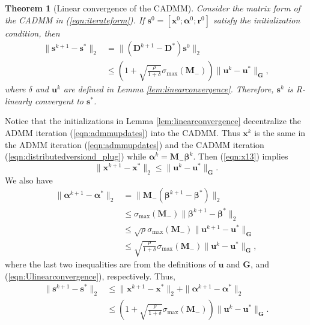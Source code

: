 \documentclass[journal]{IEEEtran}
\newtheorem{theorem}{Theorem}
\newcommand{\nn}{\nonumber}
\begin{document}
\begin{theorem}[Linear convergence of the CADMM]
\label{thm:linearconandbound}
Consider the matrix form of the CADMM in (\ref{eqn:iterateform}). If $\bm s^0=[\bm x^0;\bm\alpha^0;\bm r^0]$ satisfy the initialization condition, then 
\begin{align}
\|\bm s^{k+1}-\bm s^*\|_2 &=\|(\bm D^{k+1}-\bm D^*)\bm s^0\|_2\nn\\&\leq \left(1+\sqrt{\frac{\rho}{1+\delta}}\sigma_{\max}(\bm M_-)\right)\|\bm u^k-\bm u^*\|_{\bm G},\nn
\end{align} where $\delta$ and $\bm u^k$ are defined in Lemma \ref{lem:linearconvergence}. Therefore, $\bm s^k$ is R-linearly convergent to $\bm s^*$.
\end{theorem}
\begin{IEEEproof}
Notice that the initializations in Lemma \ref{lem:linearconvergence} decentralize the ADMM iteration (\ref{eqn:admmupdates}) into the CADMM. Thus $\bm x^k$ is the same in the ADMM iteration (\ref{eqn:admmupdates}) and the CADMM iteration (\ref{eqn:distributedversiond_plug}) while $\bm\alpha^k=\bm M_-\bm\beta^k$. Then (\ref{eqn:x13}) implies 
$$\|\bm x^{k+1}-\bm x^*\|_2\leq\|\bm u^k-\bm u^*\|_{\bm G}.$$ 
We also have  
\begin{align}
\|\bm \alpha^{k+1}-\bm\alpha^*\|_2&=\|\bm M_-(\bm\beta^{k+1}-\bm\beta^*)\|_2\nn\\&\leq\sigma_{\max}(\bm M_-)\|\bm\beta^{k+1}-\bm\beta^*\|_2\nn\\\label{eqn:alphau}&\leq\sqrt{\rho}\sigma_{\max}(\bm M_-)\|\bm u^{k+1}-\bm u^*\|_{\bm G}\\&\leq\sqrt{\frac{\rho}{1+\delta}}\sigma_{\max}(\bm M_-)\|\bm u^{k}-\bm u^*\|_{\bm G},\nn
\end{align}
where the last two inequalities are from the definitions of $\bm u$ and $\bm G$, and (\ref{eqn:Ulinearconvergence}), respectively.
Thus, 
\begin{align}
\|\bm s^{k+1}-\bm s^*\|_2&\leq\|\bm x^{k+1}-\bm x^*\|_2+\|\bm \alpha^{k+1}-\bm\alpha^*\|_2\nn\\
&\leq\left(1+\sqrt{\frac{\rho}{1+\delta}}\sigma_{\max}(\bm M_-)\right)\|\bm u^k-\bm u^*\|_{\bm G}.\nn
\end{align}
\end{IEEEproof}
\end{document}
